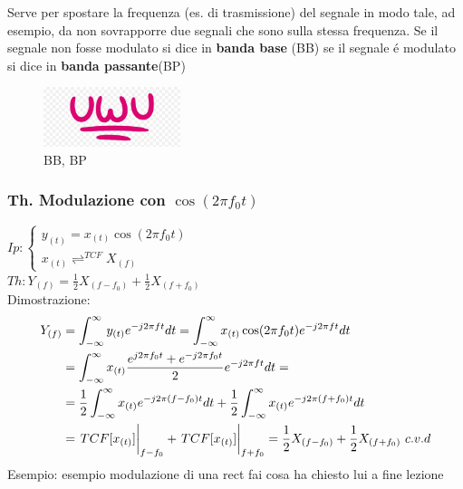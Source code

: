         Serve per spostare la frequenza (es. di trasmissione) del segnale in modo tale, ad esempio, da non sovrapporre due segnali che sono sulla stessa frequenza.
        Se il segnale non fosse modulato si dice in \textbf{banda base} (BB) se il segnale é modulato si dice in \textbf{banda passante}(BP)
        \begin{figure}[H]
            \centering
            \includegraphics[width=4cm]{media/uwu.png}
            \caption{{\color{blue}BB}, {\color{red}BP}}
            \label{fig:bb e bp}
        \end{figure}

        \subsubsection{Th. Modulazione con $\cos(2\pi f_0t)$}\label{Modulazione con coseno}
            $Ip:\begin{cases}
                    y_{(t)}= x_{(t)}\cos(2\pi f_0t)\\        
                    x_{(t)}\rightleftharpoons^{TCF} X_{(f)}
                \end{cases}$\\
            $Th: Y_{(f)} = \frac{1}{2} X_{(f-f_0)} + \frac{1}{2} X_{(f+f_0)}$ \\
            Dimostrazione:
            \begin{align}
                Y_{(f)} & = \int_{-\infty}^{\infty} y_{(t)} e^{-j2\pi ft} dt = \int_{-\infty}^{\infty} x_{(t)}\cos(2\pi f_0t) e^{-j2\pi ft} dt \nonumber \\
                & =\int_{-\infty}^{\infty} x_{(t)} \frac{e^{j2\pi f_0t} + e^{-j2\pi f_0t}}{2} e^{-j2\pi ft} dt =  \nonumber \\
                & = \frac{1}{2} \int_{-\infty}^{\infty} x_{(t)} e^{-j2\pi (f-f_0)t} dt + \frac{1}{2} \int_{-\infty}^{\infty} x_{(t)} e^{-j2\pi (f+f_0)t} dt \nonumber \\
                & = \eval{TCF[x_{(t)}]}_{f-f_0} + \eval{TCF[x_{(t)}]}_{f+f_0} = \frac{1}{2} X_{(f-f_0)} + \frac{1}{2} X_{(f+f_0)}\ c.v.d \nonumber  
            \end{align}
            Esempio:
            {
                esempio modulazione di una rect
            }
            fai cosa ha chiesto lui a fine lezione
